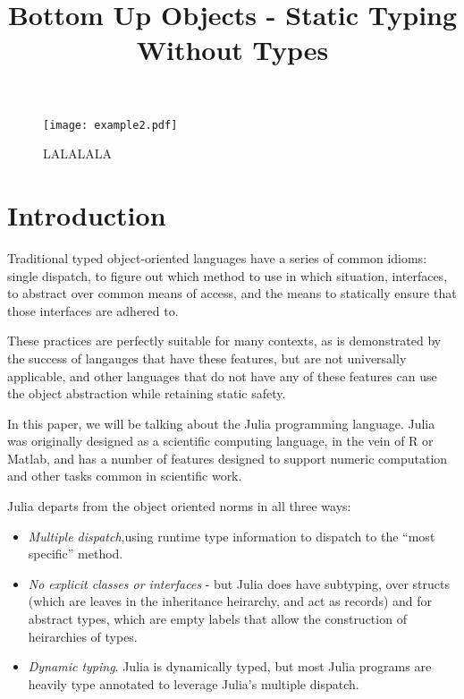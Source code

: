 \documentclass[preprint]{sigplanconf}
\begin{document}
\title{Bottom Up Objects - Static Typing Without Types} 
\maketitle

\begin{figure}
\centering
\texttt{[image: example2.pdf]}
\caption{LALALALA}
\label{fig:algo}
\end{figure}

\section{Introduction}

Traditional typed object-oriented languages have a series of
common idioms: single dispatch, to figure out which method
to use in which situation, interfaces, to abstract over 
common means of access, and the means to statically
ensure that those interfaces are adhered to.

These practices are perfectly suitable for many contexts,
as is demonstrated by the success of langauges that have 
these features, but are not universally applicable, and
other languages that do not have any of these features
can use the object abstraction while retaining static 
safety.

In this paper, we will be talking about the Julia
programming language. Julia was originally designed
as a scientific computing language, in the vein of 
R or Matlab, and has a number of features designed
to support numeric computation and other tasks common
in scientific work.

Julia departs from the object oriented norms in all 
three ways:
\begin{itemize}
\item \emph{Multiple dispatch},using runtime type
information to dispatch to the ``most specific'' method.
\item \emph{No explicit classes or interfaces} - 
but Julia does have subtyping, over structs (which are leaves in
the inheritance heirarchy, and act as records) and for 
abstract types, which are empty labels that allow the 
construction of heirarchies of types.
\item \emph{Dynamic typing}. Julia is dynamically typed,
but most Julia programs are heavily type annotated to leverage
Julia's multiple dispatch.
\end{itemize}
\end{document}
